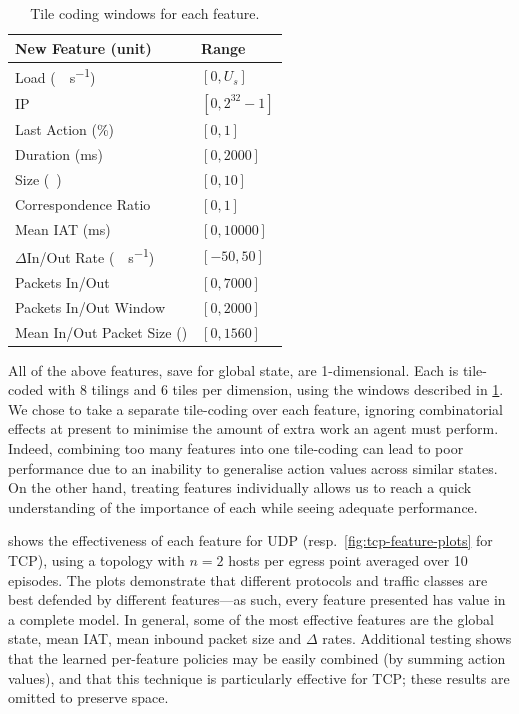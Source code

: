 \documentclass[conference, letterpaper, 10pt, times]{IEEEtran}
\begin{document}
\begin{table}
	\centering
	\caption{Tile coding windows for each feature.\label{tab:codings}}
	
	\begin{tabular}{@{}ll@{}}
		\toprule
		New Feature (unit) & Range \\
		\midrule
		Load (\si{\mega\bit\per\second}) & $[0, U_s]$ \\
		IP & $[0, 2^{32}-1]$ \\
		Last Action (\si{\percent}) & $[0, 1]$ \\
		Duration (\si{\milli\second}) & $[0, \num{2000}]$ \\
		Size (\si{\mebi\byte}) & $[0,10]$ \\
		Correspondence Ratio & $[0,1]$ \\
		Mean IAT (\si{\milli\second}) & $[0, \num{10000}]$ \\
		$\Delta$In/Out Rate (\si{\mega\bit\per\second}) & $[-50, 50]$ \\
		Packets In/Out & $[0, 7000]$ \\
		Packets In/Out Window & $[0, 2000]$ \\
		Mean In/Out Packet Size (\si{\byte}) & $[0, 1560]$ \\
		\bottomrule
	\end{tabular}
\end{table}

All of the above features, save for global state, are 1-dimensional.
Each is tile-coded with 8 tilings and 6 tiles per dimension, using the windows described in \cref{tab:codings}.
We chose to take a separate tile-coding over each feature, ignoring combinatorial effects at present to minimise the amount of extra work an agent must perform.
Indeed, combining too many features into one tile-coding can lead to poor performance due to an inability to generalise action values across similar states.
On the other hand, treating features individually allows us to reach a quick understanding of the importance of each while seeing adequate performance.

 shows the effectiveness of each feature for UDP (resp.\ \cref{fig:tcp-feature-plots} for TCP), using a topology with $n=2$ hosts per egress point averaged over 10 episodes.
The plots demonstrate that different protocols and traffic classes are best defended by different features---as such, every feature presented has value in a complete model.
In general, some of the most effective features are the global state, mean IAT, mean inbound packet size and $\Delta$ rates.
Additional testing shows that the learned per-feature policies may be easily combined (by summing action values), and that this technique is particularly effective for TCP; these results are omitted to preserve space.
\end{document}
